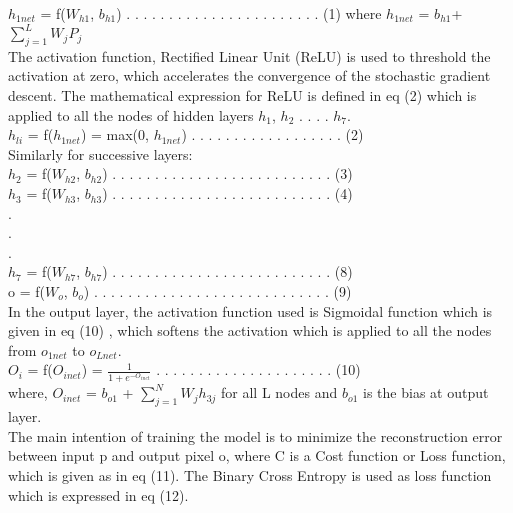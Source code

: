 \documentclass{article}
\begin{document}
$h_{1net}$ = f($W_{h1}$, $b_{h1}$) . . . . . . . . . . . . . . . . . . . . . . . (1)
where $h_{1net}$ = $b_{h1}$+ $\sum_{j=1}^L W_{j}P_{j}$ \\

The activation function, Rectified Linear Unit (ReLU) is used to threshold the activation at zero, which accelerates the convergence of the stochastic gradient descent. The mathematical expression for ReLU is defined in eq (2) which is applied to all the nodes of hidden layers $h_{1}$, $h_{2}$ . . . . $h_{7}$.\\

$h_{li}$ = f($h_{1net}$) = max(0, $h_{1net}$) . . . . . . . . . . . . . . . . . . (2)\\

Similarly for successive layers:\\

$h_{2}$ = f($W_{h2}$, $b_{h2}$) . . . . . . . . . . . . . . . . . . . . . . . . . . (3)\\

$h_{3}$ = f($W_{h3}$, $b_{h3}$) . . . . . . . . . . . . . . . . . . . . . . . . . . (4)\\

.\\

.\\

.\\

$h_{7}$ = f($W_{h7}$, $b_{h7}$) . . . . . . . . . . . . . . . . . . . . . . . . . . (8)\\

o = f($W_{o}$, $b_{o}$) . . . . . . . . . . . . . . . . . . . . . . . . . . . . (9)\\

In the output layer, the activation function used is Sigmoidal function which is given in eq (10) , which softens the activation which is applied to all the nodes from $o_{1net}$ to $o_{Lnet}$. \\

$O_{i}$ = f($O_{inet}$) = $\frac{1}{1 + e^{-{O_{inet}}}}$ . . . . . . . . . . . . . . . . . . . . . (10)\\

where, $O_{inet}$ = $b_{o1}$ + $\sum_{j=1}^N W_{j}h_{3j}$ for all L nodes and $b_{o1}$ is the
bias at output layer. \\

The main intention of training the model is to minimize the reconstruction error between input p and output pixel o, where C is a Cost function or Loss function, which is given as in eq (11). The Binary Cross Entropy is used as loss function which is expressed in eq (12).\\
\end{document}
